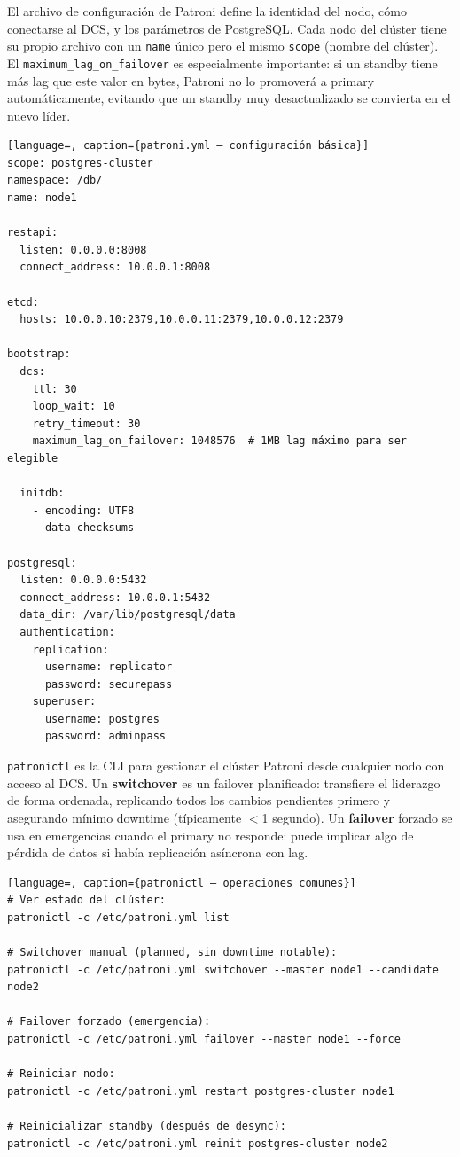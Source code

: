 El archivo de configuración de Patroni define la identidad del nodo, cómo conectarse al DCS, y los parámetros de PostgreSQL.
Cada nodo del clúster tiene su propio archivo con un \texttt{name} único pero el mismo \texttt{scope} (nombre del clúster).
El \texttt{maximum\_lag\_on\_failover} es especialmente importante: si un standby tiene más lag que este valor en bytes, Patroni no lo promoverá a primary automáticamente, evitando que un standby muy desactualizado se convierta en el nuevo líder.

\begin{lstlisting}[language=, caption={patroni.yml — configuración básica}]
scope: postgres-cluster
namespace: /db/
name: node1

restapi:
  listen: 0.0.0.0:8008
  connect_address: 10.0.0.1:8008

etcd:
  hosts: 10.0.0.10:2379,10.0.0.11:2379,10.0.0.12:2379

bootstrap:
  dcs:
    ttl: 30
    loop_wait: 10
    retry_timeout: 30
    maximum_lag_on_failover: 1048576  # 1MB lag máximo para ser elegible

  initdb:
    - encoding: UTF8
    - data-checksums

postgresql:
  listen: 0.0.0.0:5432
  connect_address: 10.0.0.1:5432
  data_dir: /var/lib/postgresql/data
  authentication:
    replication:
      username: replicator
      password: securepass
    superuser:
      username: postgres
      password: adminpass
\end{lstlisting}

\texttt{patronictl} es la CLI para gestionar el clúster Patroni desde cualquier nodo con acceso al DCS.
Un \textbf{switchover} es un failover planificado: transfiere el liderazgo de forma ordenada, replicando todos los cambios pendientes primero y asegurando mínimo downtime (típicamente $<$1 segundo).
Un \textbf{failover} forzado se usa en emergencias cuando el primary no responde: puede implicar algo de pérdida de datos si había replicación asíncrona con lag.

\begin{lstlisting}[language=, caption={patronictl — operaciones comunes}]
# Ver estado del clúster:
patronictl -c /etc/patroni.yml list

# Switchover manual (planned, sin downtime notable):
patronictl -c /etc/patroni.yml switchover --master node1 --candidate node2

# Failover forzado (emergencia):
patronictl -c /etc/patroni.yml failover --master node1 --force

# Reiniciar nodo:
patronictl -c /etc/patroni.yml restart postgres-cluster node1

# Reinicializar standby (después de desync):
patronictl -c /etc/patroni.yml reinit postgres-cluster node2
\end{lstlisting}

